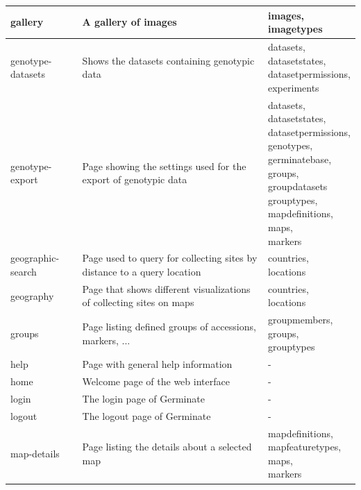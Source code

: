 \begin{longtable}{p{}p{}p{}}
	gallery                & A gallery of images & \cellwrap{images,\\imagetypes} \\ \midrule
	genotype-datasets       & Shows the datasets containing genotypic data & \cellwrap{datasets,\\datasetstates,\\datasetpermissions,\\experiments} \\ \midrule
	genotype-export         & Page showing the settings used for the export of genotypic data & \cellwrap{datasets,\\datasetstates,\\datasetpermissions,\\genotypes,\\germinatebase,\\groups,\\groupdatasets\\grouptypes,\\mapdefinitions,\\maps,\\markers} \\ \midrule
	geographic-search       & Page used to query for collecting sites by distance to a query location & \cellwrap{countries,\\locations} \\ \midrule
	geography              & Page that shows different visualizations of collecting sites on maps & \cellwrap{countries,\\locations} \\ \midrule
	groups				   & Page listing defined groups of accessions, markers, ... & \cellwrap{groupmembers,\\groups,\\grouptypes} \\ \midrule
	help				   & Page with general help information & - \\ \midrule
	home				   & Welcome page of the web interface & - \\ \midrule
	login                  & The login page of Germinate & - \\ \midrule
	logout				   & The logout page of Germinate & - \\ \midrule
	map-details			   & Page listing the details about a selected map & \cellwrap{mapdefinitions,\\mapfeaturetypes,\\maps,\\markers} \\ \midrule

\end{longtable}
